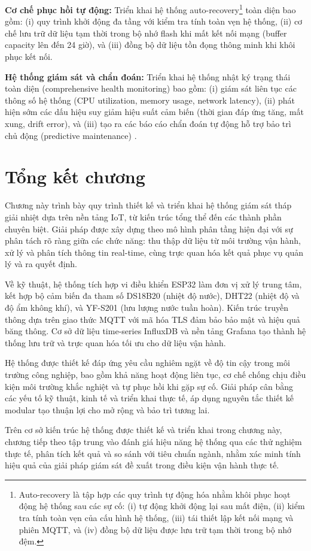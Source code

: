 \documentclass[../main.tex]{subfiles}
\begin{document}
\textbf{Cơ chế phục hồi tự động:} Triển khai hệ thống auto-recovery\footnote{Auto-recovery là tập hợp các quy trình tự động hóa nhằm khôi phục hoạt động hệ thống sau các sự cố: (i) tự động khởi động lại sau mất điện, (ii) kiểm tra tính toàn vẹn của cấu hình hệ thống, (iii) tái thiết lập kết nối mạng và phiên MQTT, và (iv) đồng bộ dữ liệu được lưu trữ tạm thời trong bộ nhớ đệm.} toàn diện bao gồm: (i) quy trình khởi động đa tầng với kiểm tra tính toàn vẹn hệ thống, (ii) cơ chế lưu trữ dữ liệu tạm thời trong bộ nhớ flash khi mất kết nối mạng (buffer capacity lên đến 24 giờ), và (iii) đồng bộ dữ liệu tồn đọng thông minh khi khôi phục kết nối.

\textbf{Hệ thống giám sát và chẩn đoán:} Triển khai hệ thống nhật ký trạng thái toàn diện (comprehensive health monitoring) bao gồm: (i) giám sát liên tục các thông số hệ thống (CPU utilization, memory usage, network latency), (ii) phát hiện sớm các dấu hiệu suy giảm hiệu suất cảm biến (thời gian đáp ứng tăng, mất xung, drift error), và (iii) tạo ra các báo cáo chẩn đoán tự động hỗ trợ bảo trì chủ động (predictive maintenance) \cite{Espressif_ESP32_technical_reference,ashrae2020cooling}.

\section{Tổng kết chương}
\label{sec:chapter3_conclusion}

Chương này trình bày quy trình thiết kế và triển khai hệ thống giám sát tháp giải nhiệt dựa trên nền tảng IoT, từ kiến trúc tổng thể đến các thành phần chuyên biệt. Giải pháp được xây dựng theo mô hình phân tầng hiện đại với sự phân tách rõ ràng giữa các chức năng: thu thập dữ liệu từ môi trường vận hành, xử lý và phân tích thông tin real-time, cùng trực quan hóa kết quả phục vụ quản lý và ra quyết định.

Về kỹ thuật, hệ thống tích hợp vi điều khiển ESP32 làm đơn vị xử lý trung tâm, kết hợp bộ cảm biến đa tham số DS18B20 (nhiệt độ nước), DHT22 (nhiệt độ và độ ẩm không khí), và YF-S201 (lưu lượng nước tuần hoàn). Kiến trúc truyền thông dựa trên giao thức MQTT với mã hóa TLS đảm bảo bảo mật và hiệu quả băng thông. Cơ sở dữ liệu time-series InfluxDB và nền tảng Grafana tạo thành hệ thống lưu trữ và trực quan hóa tối ưu cho dữ liệu vận hành.

Hệ thống được thiết kế đáp ứng yêu cầu nghiêm ngặt về độ tin cậy trong môi trường công nghiệp, bao gồm khả năng hoạt động liên tục, cơ chế chống chịu điều kiện môi trường khắc nghiệt và tự phục hồi khi gặp sự cố. Giải pháp cân bằng các yếu tố kỹ thuật, kinh tế và triển khai thực tế, áp dụng nguyên tắc thiết kế modular tạo thuận lợi cho mở rộng và bảo trì tương lai.

Trên cơ sở kiến trúc hệ thống được thiết kế và triển khai trong chương này, chương tiếp theo tập trung vào đánh giá hiệu năng hệ thống qua các thử nghiệm thực tế, phân tích kết quả và so sánh với tiêu chuẩn ngành, nhằm xác minh tính hiệu quả của giải pháp giám sát đề xuất trong điều kiện vận hành thực tế.
\end{document}
